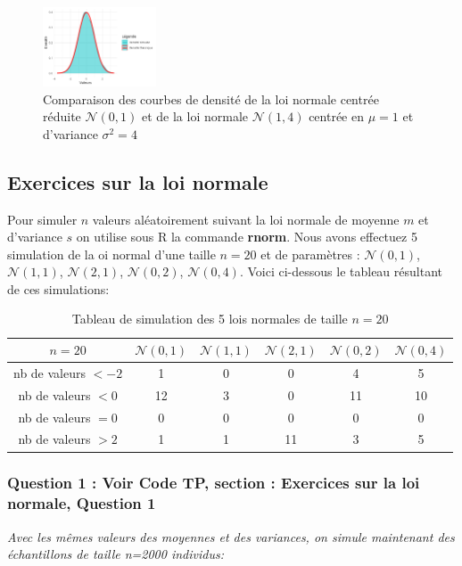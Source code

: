             \begin{figure}[H]
                \centering
                \includegraphics[width=0.3\textwidth]{4_attachments/figures/reduced_plot.png}
                \caption{Comparaison des courbes de densité de la loi normale centrée réduite $\mathcal N(0,1)$ et de la loi normale $\mathcal N(1,4)$ centrée en $\mu=1$ et d'variance $\sigma^2=4$}
                \label{fig:theoreme}
            \end{figure}


    \subsection{Exercices sur la loi normale}
        Pour simuler $n$ valeurs aléatoirement suivant la loi normale de moyenne $m$ et d’variance $s$ on utilise sous R la commande \textbf{rnorm}.
        Nous avons effectuez 5 simulation de la oi normal d'une taille $n=20$ et de paramètres : $\mathcal N(0,1)$, $\mathcal N(1,1)$, $\mathcal N(2,1)$, $\mathcal N(0,2)$, $\mathcal N(0,4)$.
        Voici ci-dessous le tableau résultant de ces simulations:

        \begin{table}[H]
            \centering
            \begin{tabular}{|c|c|c|c|c|c|}
                \hline
                $n=20$&$\mathcal N(0,1)$&$\mathcal N(1,1)$&$\mathcal N(2,1)$&$\mathcal N(0,2)$&$\mathcal N(0,4)$ \\ 
                \hline
                nb de valeurs $< -2$ & 1 & 0 & 0 & 4 & 5 \\
                nb de valeurs $< 0$ & 12 & 3 & 0 & 11 & 10 \\
                nb de valeurs $= 0$ & 0 & 0 & 0 & 0 & 0 \\
                nb de valeurs $> 2$ & 1 & 1 & 11 & 3 & 5 \\
                \hline
            \end{tabular}
            \caption{Tableau de simulation des 5 lois normales de taille $n=20$}
            \label{tab:tab1}
        \end{table}

        \subsubsection{Question 1 : Voir Code TP, section : Exercices sur la loi normale, Question 1 \cite{TP}}
            \begin{center}
                \textit{Avec les mêmes valeurs des moyennes et des variances, on simule maintenant des échantillons de taille n=2000 individus:}
            \end{center}

